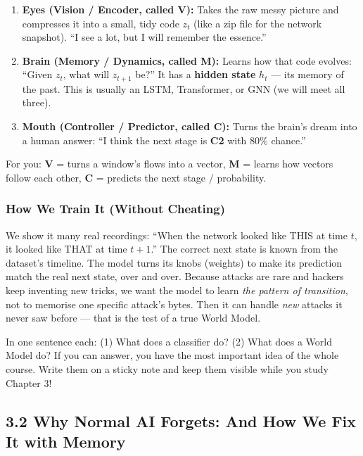 \documentclass[11pt,a4paper]{article}
\begin{document}
\begin{enumerate}[leftmargin=1.8em,itemsep=2pt]
  \item \textbf{Eyes (Vision / Encoder, called V):} Takes the raw messy picture
        and compresses it into a small, tidy code $z_t$ (like a zip file for
the network snapshot). ``I see a lot, but I will remember the essence.''
  \item \textbf{Brain (Memory / Dynamics, called M):} Learns how that code
evolves: ``Given $z_t$, what will $z_{t+1}$ be?'' It has a \textbf{hidden
state} $h_t$ --- its memory of the past. This is usually an LSTM,
Transformer, or GNN (we will meet all three).
  \item \textbf{Mouth (Controller / Predictor, called C):} Turns the brain's
dream into a human answer: ``I think the next stage is \textbf{C2}
with 80\% chance.''
\end{enumerate}

For you: \textbf{V} = turns a window's flows into a vector,
\textbf{M} = learns how vectors follow each other,
\textbf{C} = predicts the next stage / probability.

\subsubsection{How We Train It (Without Cheating)}

We show it many real recordings: ``When the network looked like THIS at time
$t$, it looked like THAT at time $t+1$.'' The correct next state is known from
the dataset's timeline. The model turns its knobs (weights) to make its
prediction match the real next state, over and over. Because attacks are rare
and hackers keep inventing new tricks, we want the model to learn \emph{the
pattern of transition}, not to memorise one specific attack's bytes. Then it
can handle \emph{new} attacks it never saw before --- that is the test of a
true World Model.

\begin{yourturn}
In one sentence each: (1) What does a classifier do? (2) What does a World
Model do? If you can answer, you have the most important idea of the whole
course. Write them on a sticky note and keep them visible while you study
Chapter 3!
\end{yourturn}

\subsection{3.2 Why Normal AI Forgets: And How We Fix It with Memory}
\label{sec:rnn}
\end{document}
